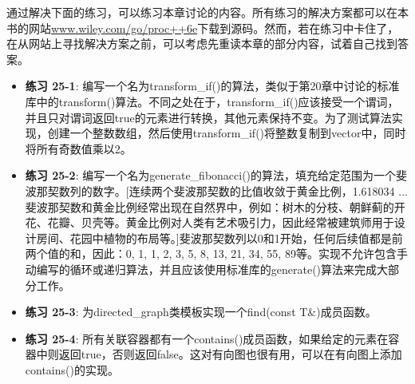 通过解决下面的练习，可以练习本章讨论的内容。所有练习的解决方案都可以在本书的网站\url{www.wiley.com/go/proc++6e}下载到源码。然而，若在练习中卡住了，在从网站上寻找解决方案之前，可以考虑先重读本章的部分内容，试着自己找到答案。

\begin{itemize}
\item
\textbf{练习 25-1}: 编写一个名为transform\_if()的算法，类似于第20章中讨论的标准库中的transform()算法。不同之处在于，transform\_if()应该接受一个谓词，并且只对谓词返回true的元素进行转换，其他元素保持不变。为了测试算法实现，创建一个整数数组，然后使用transform\_if()将整数复制到vector中，同时将所有奇数值乘以2。

\item
\textbf{练习 25-2}: 编写一个名为generate\_fibonacci()的算法，填充给定范围为一个斐波那契数列的数字。[连续两个斐波那契数的比值收敛于黄金比例，1.618034 ... 斐波那契数和黄金比例经常出现在自然界中，例如：树木的分枝、朝鲜蓟的开花、花瓣、贝壳等。黄金比例对人类有艺术吸引力，因此经常被建筑师用于设计房间、花园中植物的布局等。]斐波那契数列以0和1开始，任何后续值都是前两个值的和，因此：0, 1, 1, 2, 3, 5, 8, 13, 21, 34, 55, 89等。实现不允许包含手动编写的循环或递归算法，并且应该使用标准库的generate()算法来完成大部分工作。

\item
\textbf{练习 25-3}: 为directed\_graph类模板实现一个find(const T\&)成员函数。

\item
\textbf{练习 25-4}: 所有关联容器都有一个contains()成员函数，如果给定的元素在容器中则返回true，否则返回false。这对有向图也很有用，可以在有向图上添加contains()的实现。
\end{itemize}











